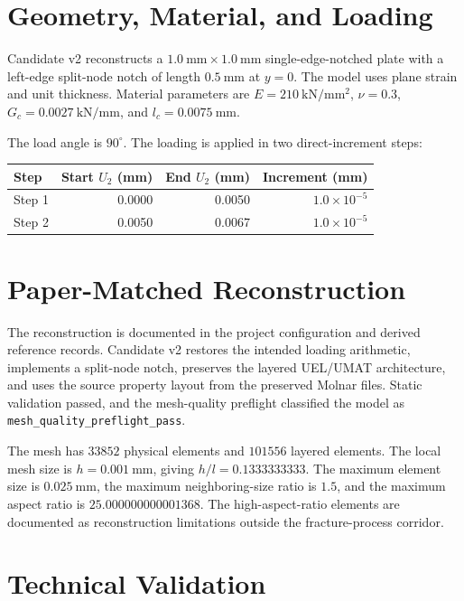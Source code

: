 \section{Geometry, Material, and Loading}

Candidate v2 reconstructs a \(1.0~\mathrm{mm}\times1.0~\mathrm{mm}\)
single-edge-notched plate with a left-edge split-node notch of length
\(0.5~\mathrm{mm}\) at \(y=0\). The model uses plane strain and unit
thickness. Material parameters are \(E=210~\mathrm{kN/mm^2}\), \(\nu=0.3\),
\(G_c=0.0027~\mathrm{kN/mm}\), and \(l_c=0.0075~\mathrm{mm}\).

The load angle is \(90^\circ\). The loading is applied in two direct-increment
steps:

\begin{center}
\begin{tabular}{lrrr}
\toprule
Step & Start \(U_2\) (mm) & End \(U_2\) (mm) & Increment (mm) \\
\midrule
Step 1 & 0.0000 & 0.0050 & \(1.0\times10^{-5}\) \\
Step 2 & 0.0050 & 0.0067 & \(1.0\times10^{-5}\) \\
\bottomrule
\end{tabular}
\end{center}

\section{Paper-Matched Reconstruction}

The reconstruction is documented in the project configuration and derived
reference records. Candidate v2 restores the intended loading arithmetic,
implements a split-node notch, preserves the layered UEL/UMAT architecture,
and uses the source property layout from the preserved Molnar files. Static
validation passed, and the mesh-quality preflight classified the model as
\texttt{mesh\_quality\_preflight\_pass}.

The mesh has \(33852\) physical elements and \(101556\) layered elements. The
local mesh size is \(h=0.001~\mathrm{mm}\), giving \(h/l=0.1333333333\). The
maximum element size is \(0.025~\mathrm{mm}\), the maximum neighboring-size
ratio is \(1.5\), and the maximum aspect ratio is \(25.000000000001368\). The
high-aspect-ratio elements are documented as reconstruction limitations outside
the fracture-process corridor.

\section{Technical Validation}

